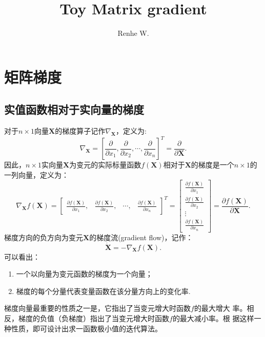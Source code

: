 \documentclass[UTF8,12pt]{ctexart}
\title{Toy Matrix gradient}
\author{Renhe W.}
\date{ }
\numberwithin{equation}{section}%
\begin{document}
	\maketitle
	\tableofcontents
	\newpage
	
	\section{矩阵梯度\label{G}}
	\subsection{实值函数相对于实向量的梯度}
	对于$n\times 1$向量$\bm{X}$的梯度算子记作$\nabla_{\bm{X}}$，定义为:
		\begin{equation}
			\nabla_{\bm{X}}=[\frac{\partial }{\partial x_1},\frac{\partial }{\partial x_2},\cdots,\frac{\partial }{\partial x_n}]^T=\frac{\partial }{\partial\bm{X} }.
		\end{equation}
	\indent 因此，$n \times 1$实向量$\bm{X}$为变元的实际标量函数$f(\bm{X})$相对于$\bm{X}$的梯度是一个$n \times 1$的一列向量，定义为：
		\begin{equation}
			\nabla_{\bm{X}}f(\bm{X})=
			\begin{bmatrix}
				\frac{\partial f(\bm{X}) }{\partial x_1},&\frac{\partial f(\bm{X})}{\partial x_2},&\cdots, &\frac{\partial f(\bm{X})}{\partial x_n}
			\end{bmatrix}^T=
			\begin{bmatrix}
				\frac{\partial f(\bm{X}) }{\partial x_1}\\
				\frac{\partial f(\bm{X})}{\partial x_2}\\
				\vdots \\
			\frac{\partial f(\bm{X}) }{\partial x_n}	
			\end{bmatrix}
		=\frac{\partial f(\bm{X})}{\partial\bm{X}}.
		\end{equation}
	\indent 梯度方向的负方向为变元$\bm{X}$的梯度流(gradient flow)，记作：
	\begin{equation}
		\dot{\bm{X}}=-\nabla_{\bm{X}}f(\bm{X}).
	\end{equation}
	\indent 可以看出：
	\begin{enumerate}
		\item 一个以向量为变元函数的梯度为一个向量；
		\item 梯度的每个分量代表变量函数在该分量方向上的变化率.
	\end{enumerate}
	\begin{tcolorbox}[enhanced]	
	\quad 梯度向量最重要的性质之一是，它指出了当变元增大时函数$f$的最大增大 率。相反，梯度的负值（负梯度）指出了当变元增大时函数$f$的最大减小率。根 据这样一种性质，即可设计出求一函数极小值的迭代算法。
	\end{tcolorbox}
	
\end{document}
